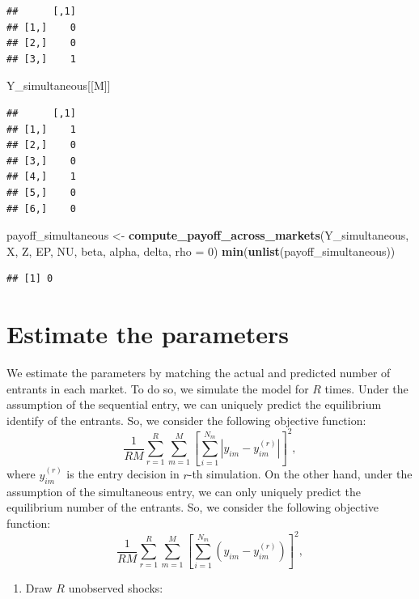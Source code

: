\documentclass[]{book}
\newenvironment{Shaded}{\begin{snugshade}}{\end{snugshade}}
\newcommand{\KeywordTok}[1]{\textcolor[rgb]{0.13,0.29,0.53}{\textbf{#1}}}
\newcommand{\DataTypeTok}[1]{\textcolor[rgb]{0.13,0.29,0.53}{#1}}
\newcommand{\DecValTok}[1]{\textcolor[rgb]{0.00,0.00,0.81}{#1}}
\newcommand{\StringTok}[1]{\textcolor[rgb]{0.31,0.60,0.02}{#1}}
\newcommand{\NormalTok}[1]{#1}
\providecommand{\tightlist}{%
  \setlength{\itemsep}{0pt}\setlength{\parskip}{0pt}}
\begin{document}
\begin{verbatim}
##      [,1]
## [1,]    0
## [2,]    0
## [3,]    1
\end{verbatim}

\begin{Shaded}
\begin{Highlighting}[]
\NormalTok{Y_simultaneous[[M]]}
\end{Highlighting}
\end{Shaded}

\begin{verbatim}
##      [,1]
## [1,]    1
## [2,]    0
## [3,]    0
## [4,]    1
## [5,]    0
## [6,]    0
\end{verbatim}

\begin{Shaded}
\begin{Highlighting}[]
\NormalTok{payoff_simultaneous <-}
\StringTok{  }\KeywordTok{compute_payoff_across_markets}\NormalTok{(Y_simultaneous, X, Z, EP, NU, beta, alpha, delta, }\DataTypeTok{rho =} \DecValTok{0}\NormalTok{)}
\KeywordTok{min}\NormalTok{(}\KeywordTok{unlist}\NormalTok{(payoff_simultaneous))}
\end{Highlighting}
\end{Shaded}

\begin{verbatim}
## [1] 0
\end{verbatim}

\section{Estimate the parameters}\label{estimate-the-parameters-4}

We estimate the parameters by matching the actual and predicted number
of entrants in each market. To do so, we simulate the model for \(R\)
times. Under the assumption of the sequential entry, we can uniquely
predict the equilibrium identify of the entrants. So, we consider the
following objective function: \[
\frac{1}{RM}\sum_{r = 1}^R \sum_{m = 1}^M \left[\sum_{i = 1}^{N_m}|y_{im} - y_{im}^{(r)}| \right]^2,
\] where \(y_{im}^{(r)}\) is the entry decision in \(r\)-th simulation.
On the other hand, under the assumption of the simultaneous entry, we
can only uniquely predict the equilibrium number of the entrants. So, we
consider the following objective function: \[
\frac{1}{RM}\sum_{r = 1}^R \sum_{m = 1}^M \left[\sum_{i = 1}^{N_m}(y_{im} - y_{im}^{(r)}) \right]^2,
\]

\begin{enumerate}
\def\labelenumi{\arabic{enumi}.}
\tightlist
\item
  Draw \(R\) unobserved shocks:
\end{enumerate}
\end{document}
